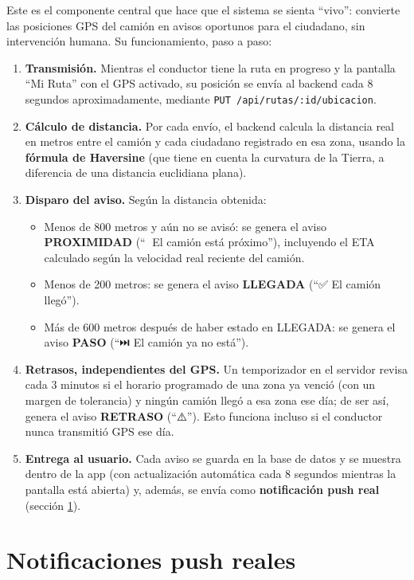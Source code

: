 \documentclass[11pt,a4paper]{article}
\begin{document}
Este es el componente central que hace que el sistema se sienta ``vivo'': convierte las posiciones GPS del camión en avisos oportunos para el ciudadano, sin intervención humana. Su funcionamiento, paso a paso:

\begin{enumerate}
    \item \textbf{Transmisión.} Mientras el conductor tiene la ruta en progreso y la pantalla ``Mi Ruta'' con el GPS activado, su posición se envía al backend cada 8 segundos aproximadamente, mediante \texttt{PUT /api/rutas/:id/ubicacion}.
    \item \textbf{Cálculo de distancia.} Por cada envío, el backend calcula la distancia real en metros entre el camión y cada ciudadano registrado en esa zona, usando la \textbf{fórmula de Haversine} (que tiene en cuenta la curvatura de la Tierra, a diferencia de una distancia euclidiana plana).
    \item \textbf{Disparo del aviso.} Según la distancia obtenida:
    \begin{itemize}
        \item Menos de 800 metros y aún no se avisó: se genera el aviso \textbf{PROXIMIDAD} (``🔔 El camión está próximo''), incluyendo el ETA calculado según la velocidad real reciente del camión.
        \item Menos de 200 metros: se genera el aviso \textbf{LLEGADA} (``✅ El camión llegó'').
        \item Más de 600 metros después de haber estado en LLEGADA: se genera el aviso \textbf{PASO} (``⏭️ El camión ya no está'').
    \end{itemize}
    \item \textbf{Retrasos, independientes del GPS.} Un temporizador en el servidor revisa cada 3 minutos si el horario programado de una zona ya venció (con un margen de tolerancia) y ningún camión llegó a esa zona ese día; de ser así, genera el aviso \textbf{RETRASO} (``⚠️''). Esto funciona incluso si el conductor nunca transmitió GPS ese día.
    \item \textbf{Entrega al usuario.} Cada aviso se guarda en la base de datos y se muestra dentro de la app (con actualización automática cada 8 segundos mientras la pantalla está abierta) y, además, se envía como \textbf{notificación push real} (sección \ref{sec:push}).
\end{enumerate}

\section{Notificaciones push reales}
\label{sec:push}
\end{document}
